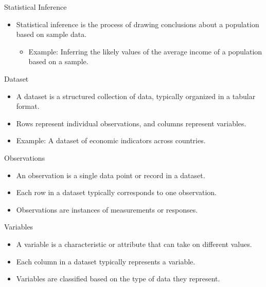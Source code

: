 \documentclass[handout]{beamer} %
\begin{document}
\begin{frame}{Statistical Inference}
    \begin{itemize}
        \item Statistical inference is the process of drawing conclusions about a population based on sample data.
            \begin{itemize}
                \item Example: Inferring the likely values of the average income of a population based on a sample.
            \end{itemize}
    \end{itemize}
\end{frame}

\begin{frame}{Dataset}
    \begin{itemize}
        \item A dataset is a structured collection of data, typically organized in a tabular format.
        \item Rows represent individual observations, and columns represent variables.
        \item Example: A dataset of economic indicators across countries.
    \end{itemize}
\end{frame}

\begin{frame}{Observations}
    \begin{itemize}
        \item An observation is a single data point or record in a dataset.
        \item Each row in a dataset typically corresponds to one observation.
        \item Observations are instances of measurements or responses.
    \end{itemize}
\end{frame}

\begin{frame}{Variables}
    \begin{itemize}
        \item A variable is a characteristic or attribute that can take on different values.
        \item Each column in a dataset typically represents a variable.
        \item Variables are classified based on the type of data they represent.
    \end{itemize}
\end{frame}
\end{document}
